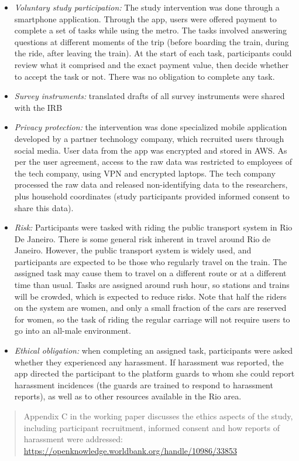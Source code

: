 \documentclass[
]{book}
\providecommand{\tightlist}{%
  \setlength{\itemsep}{0pt}\setlength{\parskip}{0pt}}
\begin{document}
\begin{ex}
\begin{itemize}
\tightlist
\item
  \emph{Voluntary study participation:} The study intervention was done through a smartphone application. Through the app, users were offered payment to complete a set of tasks while using the metro. The tasks involved answering questions at different moments of the trip (before boarding the train, during the ride, after leaving the train). At the start of each task, participants could review what it comprised and the exact payment value, then decide whether to accept the task or not. There was no obligation to complete any task.
\item
  \emph{Survey instruments:} translated drafts of all survey instruments were shared with the IRB
\item
  \emph{Privacy protection:} the intervention was done specialized mobile application developed by a partner technology company, which recruited users through social media. User data from the app was encrypted and stored in AWS. As per the user agreement, access to the raw data was restricted to employees of the tech company, using VPN and encrypted laptops. The tech company processed the raw data and released non-identifying data to the researchers, plus household coordinates (study participants provided informed consent to share this data).
\item
  \emph{Risk:} Participants were tasked with riding the public transport system in Rio De Janeiro. There is some general risk inherent in travel around Rio de Janeiro. However, the public transport system is widely used, and participants are expected to be those who regularly travel on the train. The assigned task may cause them to travel on a different route or at a different time than usual. Tasks are assigned around rush hour, so stations and trains will be crowded, which is expected to reduce risks. Note that half the riders on the system are women, and only a small fraction of the cars are reserved for women, so the task of riding the regular carriage will not require users to go into an all-male environment.
\item
  \emph{Ethical obligation:} when completing an assigned task, participants were asked whether they experienced any harassment. If harassment was reported, the app directed the participant to the platform guards to whom she could report harassment incidences (the guards are trained to respond to harassment reports), as well as to other resources available in the Rio area.
\end{itemize}

\begin{quote}
Appendix C in the working paper discusses the ethics aspects of the study, including participant recruitment, informed consent and how reports of harassment were addressed: \url{https://openknowledge.worldbank.org/handle/10986/33853}
\end{quote}
\end{ex}
\end{document}
